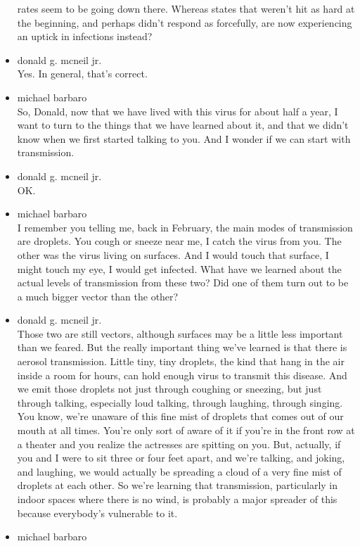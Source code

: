\begin{itemize}
  rates seem to be going down there. Whereas states that weren't hit as
  hard at the beginning, and perhaps didn't respond as forcefully, are
  now experiencing an uptick in infections instead?
\item
  donald g. mcneil jr.\\
  Yes. In general, that's correct.
\item
  michael barbaro\\
  So, Donald, now that we have lived with this virus for about half a
  year, I want to turn to the things that we have learned about it, and
  that we didn't know when we first started talking to you. And I wonder
  if we can start with transmission.
\item
  donald g. mcneil jr.\\
  OK.
\item
  michael barbaro\\
  I remember you telling me, back in February, the main modes of
  transmission are droplets. You cough or sneeze near me, I catch the
  virus from you. The other was the virus living on surfaces. And I
  would touch that surface, I might touch my eye, I would get infected.
  What have we learned about the actual levels of transmission from
  these two? Did one of them turn out to be a much bigger vector than
  the other?
\item
  donald g. mcneil jr.\\
  Those two are still vectors, although surfaces may be a little less
  important than we feared. But the really important thing we've learned
  is that there is aerosol transmission. Little tiny, tiny droplets, the
  kind that hang in the air inside a room for hours, can hold enough
  virus to transmit this disease. And we emit those droplets not just
  through coughing or sneezing, but just through talking, especially
  loud talking, through laughing, through singing. You know, we're
  unaware of this fine mist of droplets that comes out of our mouth at
  all times. You're only sort of aware of it if you're in the front row
  at a theater and you realize the actresses are spitting on you. But,
  actually, if you and I were to sit three or four feet apart, and we're
  talking, and joking, and laughing, we would actually be spreading a
  cloud of a very fine mist of droplets at each other. So we're learning
  that transmission, particularly in indoor spaces where there is no
  wind, is probably a major spreader of this because everybody's
  vulnerable to it.
\item
  michael barbaro\\

\end{itemize}
